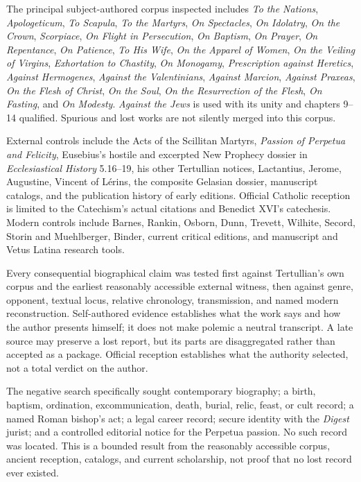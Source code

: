 The principal subject-authored corpus inspected includes \emph{To the Nations},
\emph{Apologeticum}, \emph{To Scapula}, \emph{To the Martyrs}, \emph{On
Spectacles}, \emph{On Idolatry}, \emph{On the Crown}, \emph{Scorpiace},
\emph{On Flight in Persecution}, \emph{On Baptism}, \emph{On Prayer},
\emph{On Repentance}, \emph{On Patience}, \emph{To His Wife}, \emph{On the
Apparel of Women}, \emph{On the Veiling of Virgins}, \emph{Exhortation to
Chastity}, \emph{On Monogamy}, \emph{Prescription against Heretics},
\emph{Against Hermogenes}, \emph{Against the Valentinians}, \emph{Against
Marcion}, \emph{Against Praxeas}, \emph{On the Flesh of Christ}, \emph{On the
Soul}, \emph{On the Resurrection of the Flesh}, \emph{On Fasting}, and
\emph{On Modesty}. \emph{Against the Jews} is used with its unity and chapters
9--14 qualified. Spurious and lost works are not silently merged into this
corpus.

External controls include the Acts of the Scillitan Martyrs, \emph{Passion of
Perpetua and Felicity}, Eusebius's hostile and excerpted New Prophecy dossier in
\emph{Ecclesiastical History} 5.16--19, his other Tertullian notices,
Lactantius, Jerome, Augustine, Vincent of L\'erins, the composite Gelasian
dossier, manuscript catalogs, and the publication history of early editions.
Official Catholic reception is limited to the Catechism's actual citations and
Benedict XVI's catechesis. Modern controls include Barnes, Rankin, Osborn,
Dunn, Trevett, Wilhite, Secord, Storin and Muehlberger, Binder, current
critical editions, and manuscript and Vetus Latina research tools.

Every consequential biographical claim was tested first against Tertullian's
own corpus and the earliest reasonably accessible external witness, then
against genre, opponent, textual locus, relative chronology, transmission, and
named modern reconstruction. Self-authored evidence establishes what the work
says and how the author presents himself; it does not make polemic a neutral
transcript. A late source may preserve a lost report, but its parts are
disaggregated rather than accepted as a package. Official reception establishes
what the authority selected, not a total verdict on the author.

The negative search specifically sought contemporary biography; a birth,
baptism, ordination, excommunication, death, burial, relic, feast, or cult
record; a named Roman bishop's act; a legal career record; secure identity with
the \emph{Digest} jurist; and a controlled editorial notice for the Perpetua
passion. No such record was located. This is a bounded result from the
reasonably accessible corpus, ancient reception, catalogs, and current
scholarship, not proof that no lost record ever existed.

